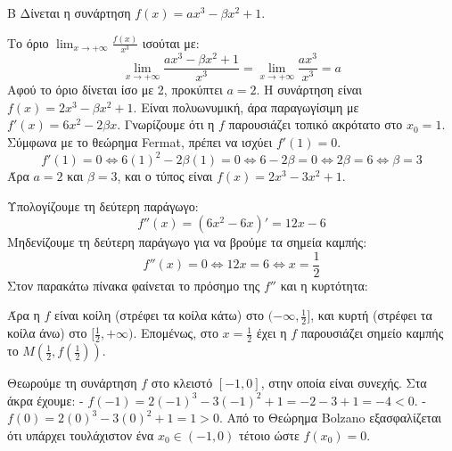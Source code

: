\begin{thema}{Β}
Δίνεται η συνάρτηση $f(x) = a x^3 - \beta x^2 + 1$.
\begin{erwthma}
\item Το όριο $\lim_{x\to+\infty} \frac{f(x)}{x^3}$ ισούται με:
\[ \lim_{x\to+\infty} \frac{a x^3 - \beta x^2 + 1}{x^3} = \lim_{x\to+\infty} \frac{a x^3}{x^3} = a \]
Αφού το όριο δίνεται ίσο με 2, προκύπτει $a=2$.
Η συνάρτηση είναι $f(x) = 2x^3 - \beta x^2 + 1$. Είναι πολυωνυμική, άρα παραγωγίσιμη με $f'(x) = 6x^2 - 2\beta x$.
Γνωρίζουμε ότι η $f$ παρουσιάζει τοπικό ακρότατο στο $x_0 = 1$. Σύμφωνα με το θεώρημα Fermat, πρέπει να ισχύει $f'(1) = 0$.
\[ f'(1) = 0 \Leftrightarrow 6(1)^2 - 2\beta(1) = 0 \Leftrightarrow 6 - 2\beta = 0 \Leftrightarrow 2\beta = 6 \Leftrightarrow \beta = 3 \]
Άρα $a=2$ και $\beta=3$, και ο τύπος είναι $f(x) = 2x^3 - 3x^2 + 1$.

\item Υπολογίζουμε τη δεύτερη παράγωγο:
\[ f''(x) = (6x^2 - 6x)' = 12x - 6 \]
Μηδενίζουμε τη δεύτερη παράγωγο για να βρούμε τα σημεία καμπής:
\[ f''(x) = 0 \Leftrightarrow 12x = 6 \Leftrightarrow x = \frac{1}{2} \]
Στον παρακάτω πίνακα φαίνεται το πρόσημο της $f''$ και η κυρτότητα:
\begin{center}
\end{center}
Άρα η $f$ είναι κοίλη (στρέφει τα κοίλα κάτω) στο $(-\infty, \frac{1}{2}]$, και κυρτή (στρέφει τα κοίλα άνω) στο $[\frac{1}{2}, +\infty)$. Επομένως, στο $x=\frac{1}{2}$ έχει η $f$ παρουσιάζει σημείο καμπής το $Μ\left(\frac{1}{2}, f\left(\frac{1}{2}\right)\right)$.

\item Θεωρούμε τη συνάρτηση $f$ στο κλειστό $[-1, 0]$, στην οποία είναι συνεχής. Στα άκρα έχουμε:
- $f(-1) = 2(-1)^3 - 3(-1)^2 + 1 = -2 - 3 + 1 = -4 < 0$.
- $f(0) = 2(0)^3 - 3(0)^2 + 1 = 1 > 0$.
Από το Θεώρημα Bolzano εξασφαλίζεται ότι υπάρχει τουλάχιστον ένα $x_0 \in (-1, 0)$ τέτοιο ώστε $f(x_0)=0$.


\end{erwthma}
\end{thema}
